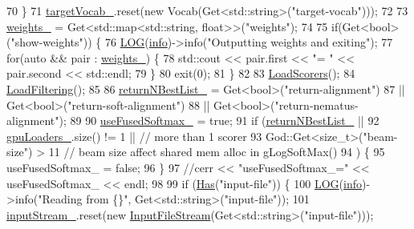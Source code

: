 \begin{DoxyCode}
{{70   \}
71   \hyperlink{classamunmt_1_1God_a38957553a6fc282c0487c4d2d9a02f90}{targetVocab\_}.reset(\textcolor{keyword}{new} Vocab(Get<std::string>(\textcolor{stringliteral}{"target-vocab"})));
72 
73   \hyperlink{classamunmt_1_1God_a45d56b77d799c8c15e0f2af351fdf212}{weights\_} = Get<std::map<std::string, float>>(\textcolor{stringliteral}{"weights"});
74 
75   \textcolor{keywordflow}{if}(Get<bool>(\textcolor{stringliteral}{"show-weights"})) \{
76     \hyperlink{amun_2common_2logging_8h_a8cad147aca8c526d3c8a03ae14d5c87d}{LOG}(\hyperlink{namespacefix__hard_a31eedbb056537bc1bef47ad5e40eaa68}{info})->info(\textcolor{stringliteral}{"Outputting weights and exiting"});
77     \textcolor{keywordflow}{for}(\textcolor{keyword}{auto} && pair : \hyperlink{classamunmt_1_1God_a45d56b77d799c8c15e0f2af351fdf212}{weights\_}) \{
78       std::cout << pair.first << \textcolor{stringliteral}{"= "} << pair.second << std::endl;
79     \}
80     exit(0);
81   \}
82 
83   \hyperlink{classamunmt_1_1God_a6ce7fae6876a5e4d39451a0de1691105}{LoadScorers}();
84   \hyperlink{classamunmt_1_1God_a112ca45757470e5bca5ec924538b5b80}{LoadFiltering}();
85 
86   \hyperlink{classamunmt_1_1God_a83284d424437eb00ebe5fcd5666cebfb}{returnNBestList\_} = Get<bool>(\textcolor{stringliteral}{"return-alignment"})
87                    || Get<bool>(\textcolor{stringliteral}{"return-soft-alignment"})
88                    || Get<bool>(\textcolor{stringliteral}{"return-nematus-alignment"});
89 
90   \hyperlink{classamunmt_1_1God_a2ea1b8cdaf00c9a882945ba8238f99ea}{useFusedSoftmax\_} = \textcolor{keyword}{true};
91   \textcolor{keywordflow}{if} (\hyperlink{classamunmt_1_1God_a83284d424437eb00ebe5fcd5666cebfb}{returnNBestList\_} ||
92       \hyperlink{classamunmt_1_1God_a2a713e550f5ee7296e7a66bd0b98339d}{gpuLoaders\_}.size() != 1 || \textcolor{comment}{// more than 1 scorer}
93       God::Get<size\_t>(\textcolor{stringliteral}{"beam-size"}) > 11 \textcolor{comment}{// beam size affect shared mem alloc in gLogSoftMax()}
94       ) \{
95     useFusedSoftmax\_ = \textcolor{keyword}{false};
96   \}
97   \textcolor{comment}{//cerr << "useFusedSoftmax\_=" << useFusedSoftmax\_ << endl;}
98 
99   \textcolor{keywordflow}{if} (\hyperlink{classamunmt_1_1God_a5c284bd5bdde636f02dbb86af55744ae}{Has}(\textcolor{stringliteral}{"input-file"})) \{
100     \hyperlink{amun_2common_2logging_8h_a8cad147aca8c526d3c8a03ae14d5c87d}{LOG}(\hyperlink{namespacefix__hard_a31eedbb056537bc1bef47ad5e40eaa68}{info})->info(\textcolor{stringliteral}{"Reading from \{\}"}, Get<std::string>(\textcolor{stringliteral}{"input-file"}));
101     \hyperlink{classamunmt_1_1God_ad61c0588d0ce38a334d220337e5185d3}{inputStream\_}.reset(\textcolor{keyword}{new} \hyperlink{classInputFileStream}{InputFileStream}(Get<std::string>(\textcolor{stringliteral}{"input-file"})));
}}
\end{DoxyCode}
